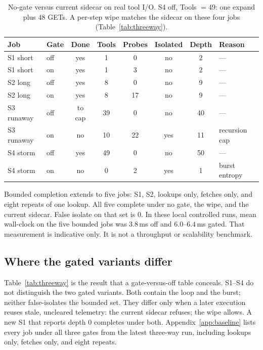\documentclass[11pt,a4paper]{article}
\begin{document}
\begin{table}[htbp]
\caption{No-gate versus current sidecar on real tool I/O. S4 off, Tools $=49$: one expand plus $48$ GETs. A per-step wipe matches the sidecar on these four jobs (Table~\ref{tab:threeway}).}
\label{tab:trace}
\centering
{\small
\begin{tabular}{@{}llcccccl@{}}
\toprule
Job & Gate & Done & Tools & Probes & Isolated & Depth & Reason \\
\midrule
S1 short & off & yes & 1 & 0 & no & 2 & --- \\
S1 short & on & yes & 1 & 3 & no & 2 & --- \\
S2 long & off & yes & 8 & 0 & no & 9 & --- \\
S2 long & on & yes & 8 & 17 & no & 9 & --- \\
S3 runaway & off & to cap & 39 & 0 & no & 40 & --- \\
S3 runaway & on & no & 10 & 22 & yes & 11 & recursion cap \\
S4 storm & off & yes & 49 & 0 & no & 50 & --- \\
S4 storm & on & no & 0 & 2 & yes & 1 & burst entropy \\
\bottomrule
\end{tabular}
}
\end{table}

Bounded completion extends to five jobs: S1, S2, lookups only, fetches only, and eight repeats of one lookup.
All five complete under no gate, the wipe, and the current sidecar.
False isolate on that set is $0$.
In these local controlled runs, mean wall-clock on the five bounded jobs was $3.8$\,ms off and $6.0$--$6.4$\,ms gated.
That measurement is indicative only.
It is not a throughput or scalability benchmark.

\subsection{Where the gated variants differ}
\label{sec:threeway}

Table~\ref{tab:threeway} is the result that a gate-versus-off table conceals.
S1--S4 do not distinguish the two gated variants.
Both contain the loop and the burst; neither false-isolates the bounded set.
They differ only when a later execution reuses stale, uncleared telemetry: the current sidecar refuses; the wipe allows.
A new S1 that reports depth $0$ completes under both.
Appendix~\ref{app:baseline} lists every job under all three gates from the latest three-way run, including lookups only, fetches only, and eight repeats.
\end{document}
